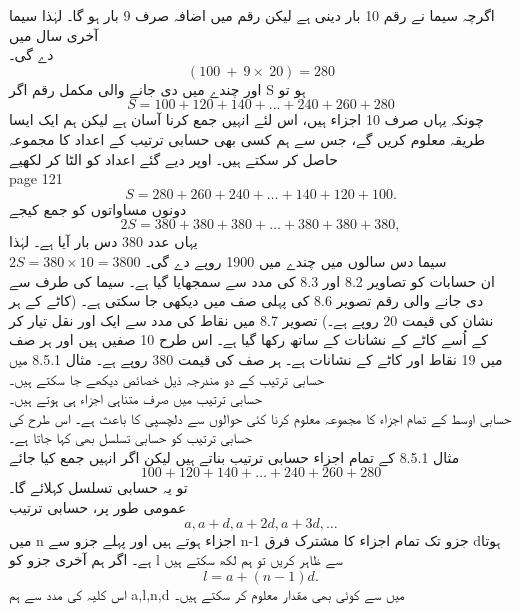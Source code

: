 اگرچہ سیما نے رقم 10 بار دینی ہے لیکن رقم میں اضافہ صرف 9 بار ہو گا۔ لہٰذا سیما آخری سال میں\\
دے گی۔\\
\[(100\ +\ 9 \times \ 20) = 280\]
اور چندے میں دی جانے والی مکمل رقم  اگر S ہو تو\\
\[S = 100 + 120 + 140 + ... + 240 + 260 + 280\]
چونکہ یہاں صرف 10 اجزاء ہیں، اس لئے انہیں جمع کرنا آسان ہے لیکن ہم ایک ایسا طریقہ معلوم کریں گے، جس سے ہم کسی بھی حسابی ترتیب کے اعداد کا مجموعہ حاصل کر سکتے ہیں۔ اوپر دیے گئے اعداد کو الٹا کر لکھیے\\
\clearpage
page 121\\
\[S=280+260+240+\dotsc+140+120+100.\]
دونوں مساواتوں کو جمع کیجے\\
\[2S=380+380+380+\dotsc+380+380+380,\]
یہاں عدد 380 دس بار آیا ہے۔ لہٰذا\\
\(2S=380\times10=3800\)
سیما دس سالوں میں چندے میں 1900 روپے دے گی۔\\
ان حسابات کو تصاویر 8.2 اور 8.3 کی مدد سے سمجھایا گیا ہے۔ سیما کی طرف سے دی جانے والی رقم تصویر 8.6 کی پہلی صف میں دیکھی جا سکتی ہے۔ (کاٹے کے ہر نشان کی قیمت 20 روپے ہے۔) تصویر 8.7 میں نقاط کی مدد سے ایک اور نقل تیار کر کے اُسے کاٹے کے نشانات کے ساتھ رکھا گیا ہے۔ اس طرح 10 صفیں ہیں اور ہر صف میں 19 نقاط اور کاٹے کے نشانات ہے۔ ہر صف کی قیمت 380 روپے ہے۔
مثال 8.5.1 میں حسابی ترتیب کے دو مندرجہ ذیل خصائص دیکھے جا سکتے ہیں۔\\
حسابی ترتیب میں صرف متناہی اجزاء ہی ہوتے ہیں۔\\
حسابی اوسط کے تمام اجزاء کا مجموعہ معلوم کرنا کئی حوالوں سے دلچسپی کا باعث ہے۔ اس طرح کی حسابی ترتیب کو حسابی تسلسل بھی کہا جاتا ہے۔\\
مثال 8.5.1 کے تمام اجزاء حسابی ترتیب بناتے ہیں لیکن اگر انہیں جمع کیا جائے\\
\[100+120+140+\dotsc+240+260+280\]
تو یہ حسابی تسلسل کہلائے گا۔\\
عمومی طور پر، حسابی ترتیب \\
\[a,a+d,a+2d,a+3d,\dotsc\]
میں n اجزاء ہوتے ہیں اور پہلے جزو سے n-1 جزو تک تمام اجزاء کا مشترک فرق dہوتا ہے۔ اگر ہم آخری جزو کو l سے ظاہر کریں تو ہم لکھ سکتے ہیں\\
\[l=a+(n-1)d.\]
اس کلیہ کی مدد سے ہم a,l,n,d میں سے کوئی بھی مقدار معلوم کر سکتے ہیں۔\\

